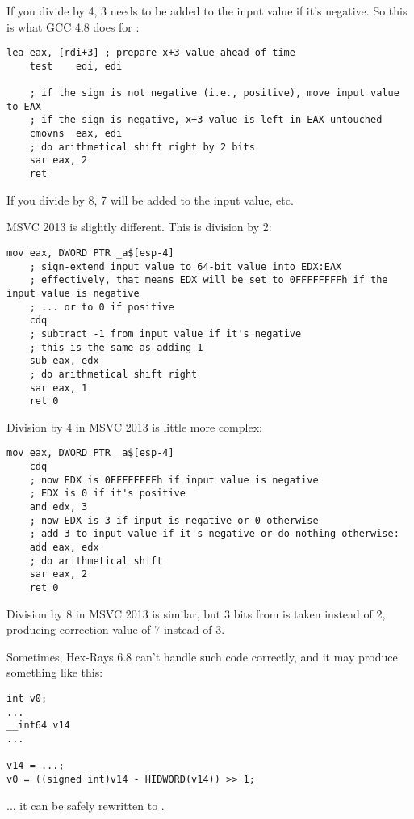 If you divide by 4, 3 needs to be added to the input value if it's negative. So this is what GCC 4.8 does for :

\begin{lstlisting}[style=customasmx86]
	lea	eax, [rdi+3] ; prepare x+3 value ahead of time
	test	edi, edi
	
	; if the sign is not negative (i.e., positive), move input value to EAX
	; if the sign is negative, x+3 value is left in EAX untouched
	cmovns	eax, edi
	; do arithmetical shift right by 2 bits
	sar	eax, 2
	ret
\end{lstlisting}

If you divide by 8, 7 will be added to the input value, etc.

MSVC 2013 is slightly different. This is division by 2:

\begin{lstlisting}[style=customasmx86]
	mov	eax, DWORD PTR _a$[esp-4]
	; sign-extend input value to 64-bit value into EDX:EAX
	; effectively, that means EDX will be set to 0FFFFFFFFh if the input value is negative
	; ... or to 0 if positive
	cdq
	; subtract -1 from input value if it's negative
	; this is the same as adding 1
	sub	eax, edx 
	; do arithmetical shift right
	sar	eax, 1
	ret	0
\end{lstlisting}

Division by 4 in MSVC 2013 is little more complex:

\begin{lstlisting}[style=customasmx86]
	mov	eax, DWORD PTR _a$[esp-4]
	cdq
	; now EDX is 0FFFFFFFFh if input value is negative
	; EDX is 0 if it's positive
	and	edx, 3
	; now EDX is 3 if input is negative or 0 otherwise
	; add 3 to input value if it's negative or do nothing otherwise:
	add	eax, edx
	; do arithmetical shift
	sar	eax, 2
	ret	0
\end{lstlisting}

Division by 8 in MSVC 2013 is similar, but 3 bits from \EDX is taken instead of 2, producing correction value of 7 instead of 3.

Sometimes, Hex-Rays 6.8 can't handle such code correctly, and it may produce something like this:

\begin{lstlisting}
int v0;
...
__int64 v14
...
          
v14 = ...;
v0 = ((signed int)v14 - HIDWORD(v14)) >> 1;
\end{lstlisting}

... it can be safely rewritten to .

